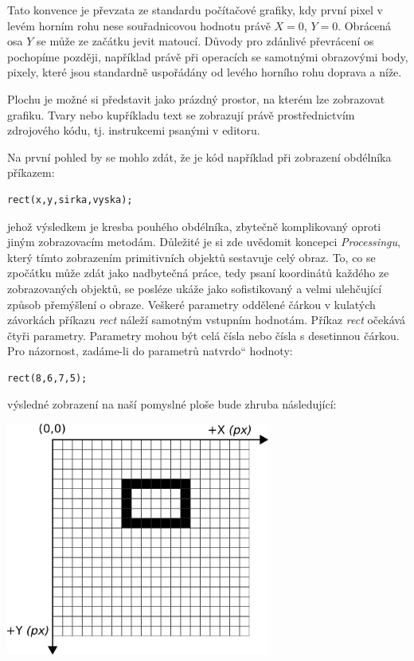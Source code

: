 \documentclass[10pt,twoside=true,open=right,cleardoublepage=empty,chapterprefix=true]{scrbook}
\renewcommand\uv[1]{\quotedblbase #1\textquotedblleft}%
\newcommand{\lnb}{\linebreak}
\begin{document}
Tato konvence je převzata ze standardu počítačové grafiky, kdy první pixel v levém horním rohu nese souřadnicovou hodnotu právě $X = 0$, $Y = 0$. Obrácená osa $Y$ se může ze začátku jevit matoucí. Důvody pro zdánlivé převrácení os pochopíme později, například právě při operacích se samotnými obrazovými body, pixely, které jsou standardně uspořádány od levého horního rohu doprava a níže.

Plochu je možné si představit jako prázdný prostor, na kterém lze zobrazovat grafiku. Tvary nebo kupříkladu text se zobrazují právě prostřednictvím zdrojového kódu, tj. instrukcemi psanými v editoru.

Na první pohled by se mohlo zdát, že je kód například při zobrazení obdélníka příkazem:

\begin{lstlisting}
rect(x,y,sirka,vyska);
\end{lstlisting}

jehož výsledkem je kresba pouhého obdélníka, zbytečně komplikovaný oproti jiným zobrazovacím metodám. Důležité je si zde uvědomit koncepci {\em Processingu}, který tímto zobrazením primitivních objektů sestavuje celý obraz. To, co se zpočátku může zdát jako nadbytečná práce, tedy psaní \lnb koordinátů každého ze zobrazovaných objektů, se posléze ukáže jako sofistikovaný a velmi ulehčující způsob přemýšlení o obraze. Veškeré parametry oddělené čárkou v kulatých závorkách příkazu {\em rect} náleží samotným vstupním hodnotám. Příkaz {\em rect} očekává čtyři parametry. Parametry mohou být celá čísla nebo čísla s desetinnou čárkou. Pro názornost, zadáme-li do parametrů \uv{natvrdo} hodnoty:

\begin{lstlisting}
rect(8,6,7,5);
\end{lstlisting}

výsledné zobrazení na naší pomyslné ploše bude zhruba následující:

\begin{center}
\includegraphics[width = 0.65\textwidth]{imgs/gridRect2d.png}
\end{center}
\end{document}
